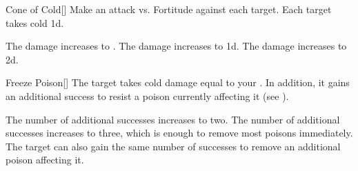 \lowercase{\hypertarget{spell:Cone of Cold}{}}\label{spell:Cone of Cold}
\begin{freeability}[Rank 1]{\hypertarget{spell:Cone of Cold}{Cone of Cold}}[]
Make an attack vs. Fortitude against each target.
\hit Each target takes cold  \minus1d.

\rankline
{} The damage increases to .
 The damage increases to  \plus1d.
 The damage increases to  \plus2d.
\end{freeability}
\vspace{0.25em}



\lowercase{\hypertarget{spell:Freeze Poison}{}}\label{spell:Freeze Poison}
\begin{freeability}[Rank 1]{\hypertarget{spell:Freeze Poison}{Freeze Poison}}[]
The target takes cold damage equal to your .
In addition, it gains an additional success to resist a poison currently affecting it (see ).

\rankline
{} The number of additional successes increases to two.
 The number of additional successes increases to three, which is enough to remove most poisons immediately.
 The target can also gain the same number of successes to remove an additional poison affecting it.
\end{freeability}
\vspace{0.25em}



